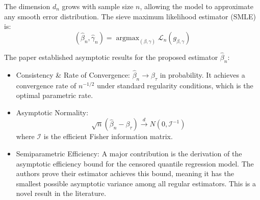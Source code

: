 \documentclass[11pt]{article}
\begin{document}
The dimension $d_n$ grows with sample size $n$, allowing the model to approximate any smooth error distribution. The sieve maximum likelihood estimator (SMLE) is:
$$ 
(\hat{\beta}_n, \hat{\gamma}_n) = \operatorname{argmax}_{(\beta, \gamma)} \mathcal{L}_n(g_{\beta, \gamma}) 
$$

\noindent The paper established asymptotic results for the proposed estimator $\hat{\beta}_n$: 

\begin{itemize}
	
	\item Consistency \& Rate of Convergence: $\hat{\beta}_n \to \beta_{\tau}$ in probability. It achieves a convergence rate of $n^{-1/2}$ under standard regularity conditions, which is the optimal parametric rate.
	
	\item Asymptotic Normality:
	$$ 
	\sqrt{n}(\hat{\beta}_n - \beta_{\tau}) \overset{d}{\to} N(0, \mathcal{I}^{-1}) 
	$$
	where $\mathcal{I}$ is the efficient Fisher information matrix.
	
	\item Semiparametric Efficiency: A major contribution is the derivation of the asymptotic efficiency bound for the censored quantile regression model. The authors prove their estimator achieves this bound, meaning it has the smallest possible asymptotic variance among all regular estimators. This is a novel result in the literature.
\end{itemize}
\end{document}
